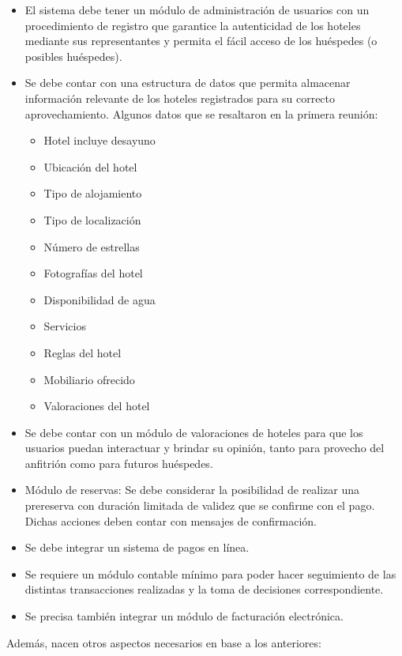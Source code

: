 \begin{itemize}
    \item El sistema debe tener un módulo de administración de usuarios con un procedimiento de registro que garantice la autenticidad de los hoteles mediante sus representantes y permita el fácil acceso de los huéspedes (o posibles huéspedes).
    \item Se debe contar con una estructura de datos que permita almacenar información relevante de los hoteles registrados para su correcto aprovechamiento. Algunos datos que se resaltaron en la primera reunión:
        \begin{itemize}
            \item Hotel incluye desayuno
            \item Ubicación del hotel
            \item Tipo de alojamiento
            \item Tipo de localización
            \item Número de estrellas
            \item Fotografías del hotel
            \item Disponibilidad de agua
            \item Servicios
            \item Reglas del hotel
            \item Mobiliario ofrecido
            \item Valoraciones del hotel
        \end{itemize}
    \item Se debe contar con un módulo de valoraciones de hoteles para que los usuarios puedan interactuar y brindar su opinión, tanto para provecho del anfitrión como para futuros huéspedes.
    \item Módulo de reservas: Se debe considerar la posibilidad de realizar una prereserva con duración limitada de validez que se confirme con el pago. Dichas acciones deben contar con mensajes de confirmación.
    \item Se debe integrar un sistema de pagos en línea.
    \item Se requiere un módulo contable mínimo para poder hacer seguimiento de las distintas transacciones realizadas y la toma de decisiones correspondiente.
    \item Se precisa también integrar un módulo de facturación electrónica.
\end{itemize}

Además, nacen otros aspectos necesarios en base a los anteriores: 

